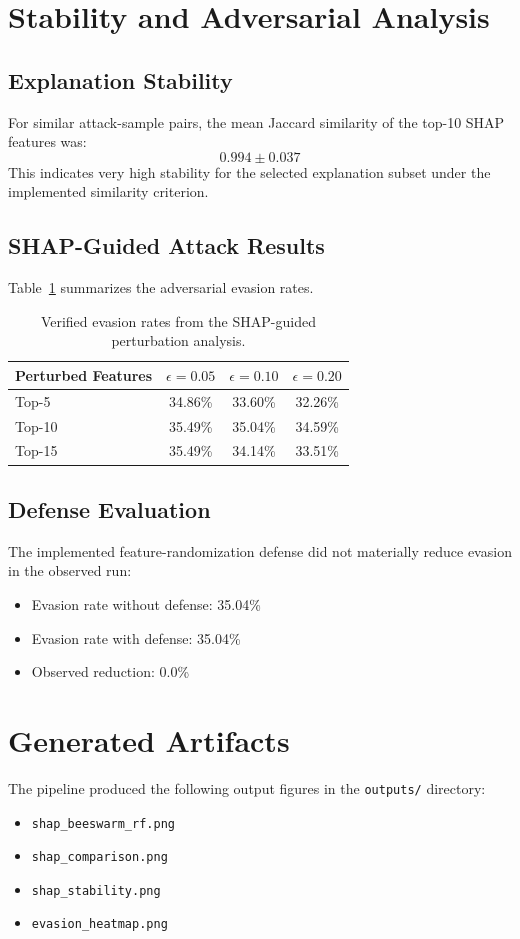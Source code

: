 \documentclass[11pt]{article}
\begin{document}
\section{Stability and Adversarial Analysis}
\subsection{Explanation Stability}
For similar attack-sample pairs, the mean Jaccard similarity of the top-10 SHAP features was:
\[
0.994 \pm 0.037
\]
This indicates very high stability for the selected explanation subset under the implemented similarity criterion.

\subsection{SHAP-Guided Attack Results}
Table~\ref{tab:attack} summarizes the adversarial evasion rates.

\begin{table}[h]
\centering
\begin{tabular}{lccc}
\toprule
Perturbed Features & $\epsilon=0.05$ & $\epsilon=0.10$ & $\epsilon=0.20$ \\
\midrule
Top-5 & 34.86\% & 33.60\% & 32.26\% \\
Top-10 & 35.49\% & 35.04\% & 34.59\% \\
Top-15 & 35.49\% & 34.14\% & 33.51\% \\
\bottomrule
\end{tabular}
\caption{Verified evasion rates from the SHAP-guided perturbation analysis.}
\label{tab:attack}
\end{table}

\subsection{Defense Evaluation}
The implemented feature-randomization defense did not materially reduce evasion in the observed run:
\begin{itemize}[leftmargin=*]
    \item Evasion rate without defense: 35.04\%
    \item Evasion rate with defense: 35.04\%
    \item Observed reduction: 0.0\%
\end{itemize}

\section{Generated Artifacts}
The pipeline produced the following output figures in the \texttt{outputs/} directory:
\begin{itemize}[leftmargin=*]
    \item \texttt{shap\_beeswarm\_rf.png}
    \item \texttt{shap\_comparison.png}
    \item \texttt{shap\_stability.png}
    \item \texttt{evasion\_heatmap.png}
\end{itemize}
\end{document}
